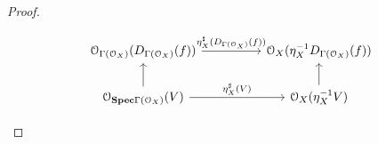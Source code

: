 \begin{proof}
\begin{enumerate}
                                $$
                                    \begin{tikzcd}
                                    	{\calO_{\Gamma(\calO_X)}(D_{\Gamma(\calO_X)}(f))} && {\calO_X(\eta_X^{-1}D_{\Gamma(\calO_X)}(f))} \\
                                    	{\calO_{\Spec \Gamma(\calO_X)}(V)} && {\calO_X(\eta_X^{-1}V)}
                                    	\arrow["{\eta_X^{\sharp}(D_{\Gamma(\calO_X)}(f))}", from=1-1, to=1-3]
                                    	\arrow["{\eta_X^{\sharp}(V)}", from=2-1, to=2-3]
                                    	\arrow[from=2-1, to=1-1]
                                    	\arrow[from=2-3, to=1-3]
                                    \end{tikzcd}
                                $$
                            

\end{enumerate}
\end{proof}
